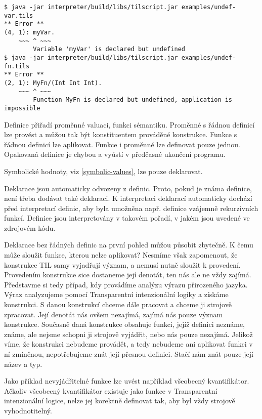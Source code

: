 \begin{lstlisting}[caption={Hlášení chyby při chybějící definici}]
$ java -jar interpreter/build/libs/tilscript.jar examples/undef-var.tils
** Error **
(4, 1): myVar.
    ~~~ ^ ~~~
        Variable 'myVar' is declared but undefined
$ java -jar interpreter/build/libs/tilscript.jar examples/undef-fn.tils
** Error **
(2, 1): MyFn/(Int Int Int).
    ~~~ ^ ~~~
        Function MyFn is declared but undefined, application is impossible
\end{lstlisting}

Definice přiřadí proměnné valuaci, funkci sémantiku. Proměnné s řádnou definicí lze provést
a můžou tak být konstituentem prováděné konstrukce. Funkce s řádnou definicí lze aplikovat. Funkce
i proměnné lze definovat pouze jednou. Opakovaná definice je chybou a vyústí v předčasné ukončení
programu.

Symbolické hodnoty, viz \ref{symbolic-values}, lze pouze deklarovat.

Deklarace jsou automaticky odvozeny z definic. Proto, pokud je známa definice, není třeba dodávat
také deklaraci. K interpretaci deklarací automaticky dochází před interpretací definic, aby byla
umožněna např. definice vzájemně rekurzivních funkcí. Definice jsou interpretovány v takovém
pořadí, v jakém jsou uvedené ve zdrojovém kódu.

Deklarace bez řádných definic na první pohled můžou působit zbytečně. K čemu může sloužit funkce,
kterou nelze aplikovat? Nesmíme však zapomenout, že konstrukce TIL samy vyjadřují význam, a nemusí
nutně sloužit k provedení. Provedením konstrukce sice dostaneme její denotát, ten nás ale ne vždy
zajímá. Představme si tedy případ, kdy provádíme analýzu výrazu přirozeného jazyka. Výraz
analyzujeme pomocí Transparentní intenzionální logiky a získáme konstrukci. S danou konstrukcí
chceme dále pracovat a chceme ji strojově zpracovat. Její denotát nás ovšem nezajímá, zajímá nás
pouze význam konstrukce. Současně daná konstrukce obsahuje funkci, jejíž definici neznáme, známe,
ale nejsme schopni ji strojově vyjádřit, nebo nás pouze nezajímá. Jelikož víme, že konstrukci
nebudeme provádět, a tedy nebudeme ani aplikovat funkci v ní zmíněnou, nepotřebujeme znát její
přesnou definici. Stačí nám znát pouze její název a typ.

Jako příklad nevyjádřitelné funkce lze uvést například všeobecný kvantifikátor. Ačkoliv všeobecný
kvantifikátor existuje jako funkce v Transparentní intenzionální logice, nelze jej korektně
definovat tak, aby byl vždy strojově vyhodnotitelný.

